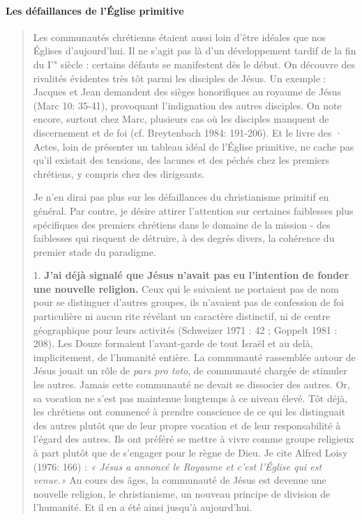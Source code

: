 \paragraph{Les défaillances de l'Église primitive}

\begin{quote}
     
\end{quote}

\begin{quote} 
 Les communautés chrétienns étaient aussi loin d'être idéales que nos    Églises d'aujourd'hui. Il ne s'agit pas là d'un développement tardif
de la fin du I'" siècle : certains défauts se manifestent dès le début. On
découvre des rivalités évidentes très tôt parmi les disciples de Jésus. Un
exemple : Jacques et Jean demandent des sièges honorifiques au
royaume de Jésus (Marc 10: 35-41), provoquant l'indignation des
autres disciples. On note encore, surtout chez Marc, plusieurs cas où
les disciples manquent de discernement et de foi (cf. Breytenbach
1984: 191-206). Et le livre des · Actes, loin de présenter un tableau
idéal de l'Église primitive, ne cache pas qu'il existait des tensions, des
lacunes et des péchés chez les premiers chrétiens, y compris chez des
dirigeants.

Je n'en dirai pas plus sur les défaillances du christianisme primitif
en général. Par contre, je désire attirer l'attention sur certaines
faiblesses plus spécifiques des premiers chrétiens dans le domaine de
la mission - des faiblesses qui risquent de détruire, à des degrés divers,
la cohérence du premier stade du paradigme.


1. \textbf{J'ai déjà signalé que Jésus n'avait pas eu l'intention de fonder
une nouvelle religion.} Ceux qui le suivaient ne portaient pas de nom
pour se distinguer d'autres groupes, ils n'avaient pas de confession de
foi particulière ni aucun rite révélant un caractère distinctif, ni de
centre géographique pour leurs activités (Schweizer 1971 : 42 ;
Goppelt 1981 : 208). Les Douze formaient l'avant-garde de tout Israël
et au delà, implicitement, de l'humanité entière. La communauté
rassemblée autour de Jésus jouait un rôle de \textit{pars pro toto}, de
communauté chargée de stimuler les autres. Jamais cette communauté
ne devait se dissocier des autres.
Or, sa vocation ne s'est pas maintenue longtemps à ce niveau élevé.
Tôt déjà, les chrétiens ont commencé à prendre conscience de ce qui
les distinguait des autres plutôt que de leur propre vocation et de leur
responsabilité à l'égard des autres. Ils ont préféré se mettre à vivre
comme groupe religieux à part plutôt que de s'engager pour le règne
de Dieu. Je cite Alfred Loisy (1976: 166) : \textit{« Jésus a annoncé le
Royaume et c'est l'Église qui est venue.»} Au cours des âges, la
communauté de Jésus est devenue une nouvelle religion, le
christianisme, un nouveau principe de division de l'humanité. Et il en
a été ainsi jusqu'à aujourd'hui.



\end{quote}
